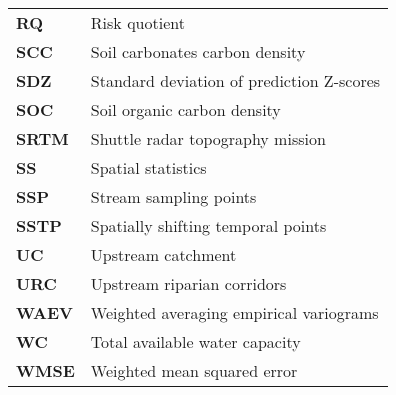 \begin{table}[hp!]
\begin{tabular}{>{\raggedright\arraybackslash}p{2.0cm}>{\raggedright\arraybackslash}p{12.0cm}}
\textbf{RQ} & Risk quotient\\
\textbf{SCC} & Soil carbonates carbon density\\
\textbf{SDZ} & Standard deviation of prediction Z-scores\\
\textbf{SOC} & Soil organic carbon density\\
\textbf{SRTM} & Shuttle radar topography mission\\
\textbf{SS} & Spatial statistics\\
\textbf{SSP} & Stream sampling points\\
\textbf{SSTP} & Spatially shifting temporal points\\
\textbf{UC} & Upstream catchment\\
\textbf{URC} & Upstream riparian corridors\\
\textbf{WAEV} & Weighted averaging empirical variograms\\
\textbf{WC} & Total available water capacity\\
\textbf{WMSE} & Weighted mean squared error

\end{tabular}

\end{table}
